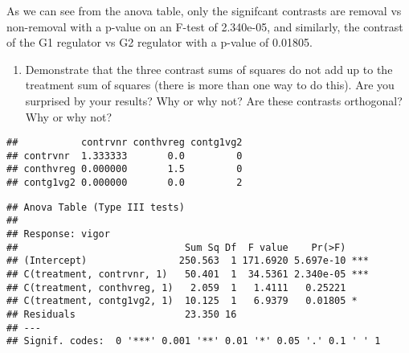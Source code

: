 \documentclass[]{article}
\newenvironment{Shaded}{\begin{snugshade}}{\end{snugshade}}
\newcommand{\KeywordTok}[1]{\textcolor[rgb]{0.13,0.29,0.53}{\textbf{#1}}}
\newcommand{\DataTypeTok}[1]{\textcolor[rgb]{0.13,0.29,0.53}{#1}}
\newcommand{\DecValTok}[1]{\textcolor[rgb]{0.00,0.00,0.81}{#1}}
\newcommand{\StringTok}[1]{\textcolor[rgb]{0.31,0.60,0.02}{#1}}
\newcommand{\CommentTok}[1]{\textcolor[rgb]{0.56,0.35,0.01}{\textit{#1}}}
\newcommand{\OperatorTok}[1]{\textcolor[rgb]{0.81,0.36,0.00}{\textbf{#1}}}
\newcommand{\NormalTok}[1]{#1}
\providecommand{\tightlist}{%
  \setlength{\itemsep}{0pt}\setlength{\parskip}{0pt}}
\begin{document}
As we can see from the anova table, only the signifcant contrasts are
removal vs non-removal with a p-value on an F-test of 2.340e-05, and
similarly, the contrast of the G1 regulator vs G2 regulator with a
p-value of 0.01805.

\begin{enumerate}
\def\labelenumi{\Alph{enumi})}
\setcounter{enumi}{3}
\tightlist
\item
  Demonstrate that the three contrast sums of squares do not add up to
  the treatment sum of squares (there is more than one way to do this).
  Are you surprised by your results? Why or why not? Are these contrasts
  orthogonal? Why or why not?
\end{enumerate}

\begin{Shaded}
\end{Shaded}

\begin{verbatim}
##           contrvnr conthvreg contg1vg2
## contrvnr  1.333333       0.0         0
## conthvreg 0.000000       1.5         0
## contg1vg2 0.000000       0.0         2
\end{verbatim}

\begin{Shaded}
\end{Shaded}

\begin{verbatim}
## Anova Table (Type III tests)
## 
## Response: vigor
##                             Sum Sq Df  F value    Pr(>F)    
## (Intercept)                250.563  1 171.6920 5.697e-10 ***
## C(treatment, contrvnr, 1)   50.401  1  34.5361 2.340e-05 ***
## C(treatment, conthvreg, 1)   2.059  1   1.4111   0.25221    
## C(treatment, contg1vg2, 1)  10.125  1   6.9379   0.01805 *  
## Residuals                   23.350 16                       
## ---
## Signif. codes:  0 '***' 0.001 '**' 0.01 '*' 0.05 '.' 0.1 ' ' 1
\end{verbatim}
\end{document}
